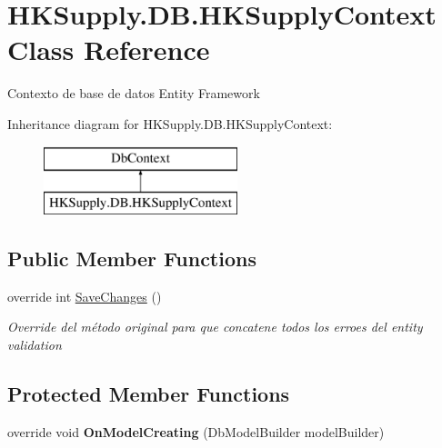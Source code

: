 \hypertarget{class_h_k_supply_1_1_d_b_1_1_h_k_supply_context}{}\section{H\+K\+Supply.\+D\+B.\+H\+K\+Supply\+Context Class Reference}
\label{class_h_k_supply_1_1_d_b_1_1_h_k_supply_context}


Contexto de base de datos Entity Framework  


Inheritance diagram for H\+K\+Supply.\+D\+B.\+H\+K\+Supply\+Context\+:\begin{figure}[H]
\begin{center}
\leavevmode
\includegraphics[height=2.000000cm]{class_h_k_supply_1_1_d_b_1_1_h_k_supply_context}
\end{center}
\end{figure}
\subsection*{Public Member Functions}
\begin{DoxyCompactItemize}
\item 
override int \hyperlink{class_h_k_supply_1_1_d_b_1_1_h_k_supply_context_a2a1188ce8fd98551e036cb87ae342132}{Save\+Changes} ()
\begin{DoxyCompactList}\small\item\em Override del método original para que concatene todos los erroes del entity validation \end{DoxyCompactList}\end{DoxyCompactItemize}
\subsection*{Protected Member Functions}
\begin{DoxyCompactItemize}
\item 
\mbox{\label{class_h_k_supply_1_1_d_b_1_1_h_k_supply_context_aeb9cce28b5eefa769efd1803771a6c4a}} 
override void {\bfseries On\+Model\+Creating} (Db\+Model\+Builder model\+Builder)
\end{DoxyCompactItemize}
